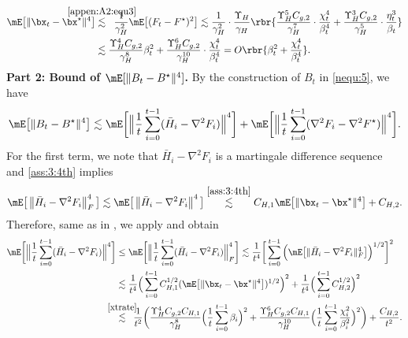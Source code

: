 \begin{align}\label{xtrate}
\mE\big[\|\bx_t-\bx^\star\|^4\big]&\stackrel{\mathclap{\eqref{appen:A2:equ3}}}{\lesssim}\;\; \frac{1}{\gamma_H^2}\mE\big[(F_t-F^\star)^2\big]
\lesssim \frac{1}{\gamma_H^2}\cdot \frac{\Upsilon_{H}}{\gamma_H}  \rbr{\frac{\Upsilon_H^5C_{g,2}}{\gamma_H^7}\cdot\frac{\chi_t^4}{\beta_t^4}  + \frac{\Upsilon_H^3C_{g,2}}{\gamma_H^5}\cdot\frac{\eta_t^3}{\beta_t}}\\
&\lesssim \frac{\Upsilon_H^4C_{g,2}}{\gamma_H^8} \beta_t^2 + \frac{\Upsilon_H^6C_{g,2}}{\gamma_H^{10}} \cdot\frac{\chi_t^4}{\beta_t^4}= O\rbr{\beta_t^2 + \frac{\chi_t^4}{\beta_t^4}}.
\end{align}
\noindent \textbf{Part 2: Bound of $\mE[\|B_t-B^\star\|^4]$.} By the construction of $B_t$ in \eqref{nequ:5}, we have
\begin{equation}\label{appen:A3:equ12}
\mE\big[\|B_t-B^\star\|^4\big] \lesssim\mE\bigg[\Big\|\frac{1}{t} \sum_{i=0}^{t-1}(\bar{H}_i-\nabla^2 F_i)\Big\|^4\bigg]
+\mE\bigg[\Big\|\frac{1}{t} \sum_{i=0}^{t-1}(\nabla^2 F_i-\nabla^2 F^\star)\Big\|^4\bigg].
\end{equation}
For the first term, we note that $\bar{H}_i-\nabla^2 F_i$ is a martingale difference sequence and \eqref{ass:3:4th} implies
\begin{equation*}
\mE\big[\left\|\bar{H}_i-\nabla^2 F_i\right\|_F^4\big] \lesssim \mE\big[\left\|\bar{H}_i-\nabla^2 F_i\right\|^4\big] \stackrel{\eqref{ass:3:4th}}{\lesssim} C_{H,1}\mE\big[\|\bx_t-\bx^\star\|^4\big] + C_{H,2}.
\end{equation*}
Therefore, same as in \cite[(63)]{Chen2020Statistical}, we apply \cite[Theorem 2.1]{Rio2008Moment} and obtain
\begin{align*}
\mE\bigg[\Big\|\frac{1}{t} \sum_{i=0}^{t-1}(\bar{H}_i-\nabla^2 F_i)\Big\|^4\bigg]&\leq  \mE\bigg[\Big\|\frac{1}{t} \sum_{i=0}^{t-1}(\bar{H}_i-\nabla^2 F_i)\Big\|_F^4\bigg]\lesssim \frac{1}{t^4}\bigg[\sum_{i=0}^{t-1}\Big(\mE\big[\|\bar{H}_i-\nabla^2 F_i\|_F^4\big]\Big)^{1 / 2}\bigg]^2\nonumber\\
&\lesssim \frac{1}{t^4}\Big(\sum_{i=0}^{t-1} C_{H,1}^{1/2}(\mE\big[\|\bx_t-\bx^\star\|^4\big])^{1/2}\Big)^2 + \frac{1}{t^4}\Big(\sum_{i=0}^{t-1} C_{H,2}^{1/2}\Big)^2\nonumber\\ 
&\stackrel{\mathclap{\eqref{xtrate}}}{\lesssim}\;\; \frac{1}{t^2}\bigg(\frac{\Upsilon_H^4 C_{g,2} C_{H,1}}{\gamma_H^8} \Big(\frac{1}{t}\sum_{i=0}^{t-1} \beta_i\Big)^2 + \frac{\Upsilon_H^6 C_{g,2} C_{H,1}}{\gamma_H^{10}}\Big(\frac{1}{t} \sum_{i=0}^{t-1} \frac{\chi_i^2}{\beta_i^2}\Big)^2 \bigg) + \frac{C_{H,2}}{t^2}.
\end{align*}
